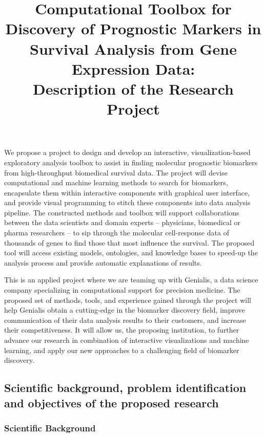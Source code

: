 \documentclass[11pt,a4paper]{article}
\begin{document}
\title{Computational Toolbox for Discovery of Prognostic Markers in Survival Analysis from Gene Expression Data: \\
Description of the Research Project}
\author{}
\date{}
\maketitle

We propose a project to design and develop an interactive, visualization-based exploratory analysis toolbox to assist in finding molecular prognostic biomarkers from high-throughput biomedical survival data. The project will devise computational and machine learning methods to search for biomarkers, encapsulate them within interactive components with graphical user interface, and provide visual programming to stitch these components into data analysis pipeline. The constructed methods and toolbox will support collaborations between the data scientists and domain experts – physicians, biomedical or pharma researchers – to sip through the molecular cell-response data of thousands of genes to find those that most influence the survival. The proposed tool will access existing models, ontologies, and knowledge bases to speed-up the analysis process and provide automatic explanations of results. 

This is an applied project where we are teaming up with Genialis, a data science company specializing in computational support for precision medicine. The proposed set of methods, tools, and experience gained through the project will help Genialis obtain a cutting-edge in the biomarker discovery field, improve communication of their data analysis results to their customers, and increase their competitiveness. It will allow us, the proposing institution, to further advance our research in combination of interactive visualizations and machine learning, and apply our new approaches to a challenging field of biomarker discovery.

\subsection{Scientific background, problem identification and objectives of the proposed research}



\subsubsection*{Scientific Background}
\end{document}
